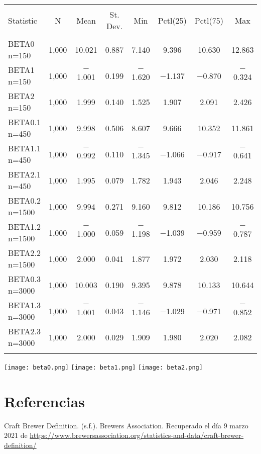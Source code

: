 \documentclass[
]{article}
\begin{document}
\begin{table}[!htbp] \centering 
  \caption{} 
  \label{} 
\begin{tabular}{@{\extracolsep{5pt}}lccccccc} 
\\[-1.8ex]\hline 
\hline \\[-1.8ex] 
Statistic & \multicolumn{1}{c}{N} & \multicolumn{1}{c}{Mean} & \multicolumn{1}{c}{St. Dev.} & \multicolumn{1}{c}{Min} & \multicolumn{1}{c}{Pctl(25)} & \multicolumn{1}{c}{Pctl(75)} & \multicolumn{1}{c}{Max} \\ 
\hline \\[-1.8ex] 
BETA0 n=150 & 1,000 & 10.021 & 0.887 & 7.140 & 9.396 & 10.630 & 12.863 \\ 
BETA1 n=150 & 1,000 & $-$1.001 & 0.199 & $-$1.620 & $-$1.137 & $-$0.870 & $-$0.324 \\ 
BETA2 n=150& 1,000 & 1.999 & 0.140 & 1.525 & 1.907 & 2.091 & 2.426 \\ 
BETA0.1  n=450& 1,000 & 9.998 & 0.506 & 8.607 & 9.666 & 10.352 & 11.861 \\ 
BETA1.1 n=450& 1,000 & $-$0.992 & 0.110 & $-$1.345 & $-$1.066 & $-$0.917 & $-$0.641 \\ 
BETA2.1 n=450& 1,000 & 1.995 & 0.079 & 1.782 & 1.943 & 2.046 & 2.248 \\ 
BETA0.2 n=1500& 1,000 & 9.994 & 0.271 & 9.160 & 9.812 & 10.186 & 10.756 \\ 
BETA1.2 n=1500& 1,000 & $-$1.000 & 0.059 & $-$1.198 & $-$1.039 & $-$0.959 & $-$0.787 \\ 
BETA2.2 n=1500& 1,000 & 2.000 & 0.041 & 1.877 & 1.972 & 2.030 & 2.118 \\ 
BETA0.3 n=3000& 1,000 & 10.003 & 0.190 & 9.395 & 9.878 & 10.133 & 10.644 \\ 
BETA1.3 n=3000& 1,000 & $-$1.001 & 0.043 & $-$1.146 & $-$1.029 & $-$0.971 & $-$0.852 \\ 
BETA2.3 n=3000& 1,000 & 2.000 & 0.029 & 1.909 & 1.980 & 2.020 & 2.082 \\ 
\hline \\[-1.8ex] 
\end{tabular} 
\end{table}

\texttt{[image: beta0.png]}
\texttt{[image: beta1.png]}
\texttt{[image: beta2.png]}

\hypertarget{referencias}{%
\section{Referencias}\label{referencias}}

Craft Brewer Definition. (s.f.). Brewers Association. Recuperado el día
9 marzo 2021 de
\url{https://www.brewersassociation.org/statistics-and-data/craft-brewer-definition/}
\end{document}
